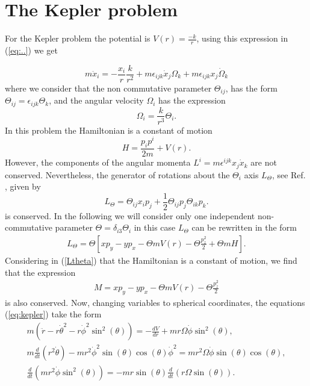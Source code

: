 \documentclass[a4paper,12pt]{article}
\newcommand{\rof}[1]{(\ref{eq:#1})}
\begin{document}
\section{The Kepler problem}
For the Kepler problem the potential is  $V(r)=\frac{-k}{r}$,
using  this expression in \rof{..} we get


\begin{equation}
m\ddot x_{i}=-\frac{x_{i}}{r}\frac{k }{r^{2}}+m\epsilon_{ijk}\dot
x_{j} \Omega_{k}+m\epsilon_{ijk}x_{j}\dot
\Omega_{k}\label{eq:kepler}
\end{equation}
where we consider that the non commutative parameter
$\Theta_{ij}$, has the form
$\Theta_{ij}=\epsilon_{ijk}\Theta_{k}$, and the angular velocity
$\Omega_i$ has the expression
$$\Omega_{i}=\frac{k}{r^{3}}\Theta_{i}.$$
In this problem the Hamiltonian is a constant of motion
\begin{equation}
 H=\frac{p_{i}p^{i}}{2m}+V(r).
\end{equation}
However, the components of the angular momenta $L^i = m
\epsilon^{ijk} x_j \dot x_k$ are not conserved. Nevertheless, the
generator of rotations about the $\Theta_i$ axis $L_{\Theta}$, see
Ref. \cite{david:gnus}, given by
\begin{equation}
L_{\Theta}=\Theta_{ij}x_{i}p_{j}+\frac{1}{2}
\Theta_{ij}p_{j}\Theta_{ik}p_{k}.
\end{equation}
is conserved. In the following we will consider only one
independent  non-commutative parameter $\Theta
=\delta_{i3}\Theta_i$ in this case $L_{\Theta}$ can be rewritten
in the form
\begin{eqnarray} \label{Ltheta}
 L_{\Theta}=\Theta\left[xp_{y}-yp_{x}-\Theta mV(r)-\Theta \frac{p_{z}^{2}}{2}+\Theta mH\right].
\end{eqnarray}
Considering in (\ref{Ltheta}) that the Hamiltonian is a constant
of motion, we find that the expression
\begin{eqnarray}\label{MM}
M=xp_{y}-yp_{x}-\Theta mV(r)-\Theta \frac{p_{z}^{2}}{2}
\end{eqnarray}
is also conserved. Now, changing variables to spherical
coordinates, the equations \rof{kepler} take the form
\begin{eqnarray}
m(\ddot r -r\dot \theta^{2}-r\dot \phi^{2}{\sin}^{2}(\theta))=
-\frac{dV}{dr}+mr\Omega\dot \phi {\sin}^{2}(\theta), \label{sphe1}\\
m \frac{d}{dt}(r^{2}\dot\theta)-mr^{2}\dot \phi^{2}{\sin}(\theta){\cos}(\theta)\dot \phi^{2}=
m r^{2}\Omega\dot \phi {\sin}(\theta){\cos}(\theta),\label{sphe2}\\
\frac{d}{dt}(mr^{2}\dot \phi {\sin}^{2}(\theta))=-mr{\sin}(\theta)
\frac{d}{dt}(r\Omega {\sin}(\theta)). \label{sphe3}
\end{eqnarray}
\end{document}
